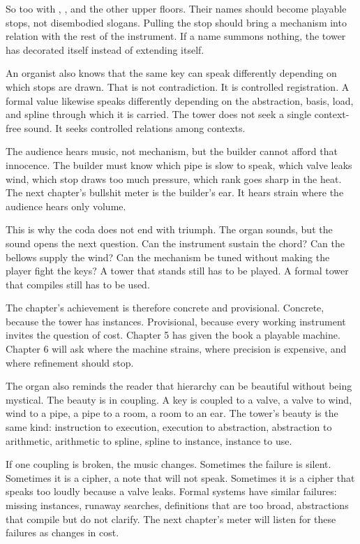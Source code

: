 So too with , , and the other upper floors. Their
names should become playable stops, not disembodied slogans. Pulling the stop
should bring a mechanism into relation with the rest of the instrument. If a
name summons nothing, the tower has decorated itself instead of extending
itself.

An organist also knows that the same key can speak differently depending on
which stops are drawn. That is not contradiction. It is controlled
registration. A formal value likewise speaks differently depending on the
abstraction, basis, load, and spline through which it is carried. The tower
does not seek a single context-free sound. It seeks controlled relations among
contexts.

The audience hears music, not mechanism, but the builder cannot afford that
innocence. The builder must know which pipe is slow to speak, which valve leaks
wind, which stop draws too much pressure, which rank goes sharp in the heat.
The next chapter's bullshit meter is the builder's ear. It hears strain where
the audience hears only volume.

This is why the coda does not end with triumph. The organ sounds, but the
sound opens the next question. Can the instrument sustain the chord? Can the
bellows supply the wind? Can the mechanism be tuned without making the player
fight the keys? A tower that stands still has to be played. A formal tower
that compiles still has to be used.

The chapter's achievement is therefore concrete and provisional. Concrete,
because the tower has instances. Provisional, because every working instrument
invites the question of cost. Chapter 5 has given the book a playable machine.
Chapter 6 will ask where the machine strains, where precision is expensive,
and where refinement should stop.

The organ also reminds the reader that hierarchy can be beautiful without
being mystical. The beauty is in coupling. A key is coupled to a valve, a valve
to wind, wind to a pipe, a pipe to a room, a room to an ear. The tower's beauty
is the same kind: instruction to execution, execution to abstraction,
abstraction to arithmetic, arithmetic to spline, spline to instance,
instance to use.

If one coupling is broken, the music changes. Sometimes the failure is silent.
Sometimes it is a cipher, a note that will not speak. Sometimes it is a cipher
that speaks too loudly because a valve leaks. Formal systems have similar
failures: missing instances, runaway searches, definitions that are too broad,
abstractions that compile but do not clarify. The next chapter's meter will
listen for these failures as changes in cost.

